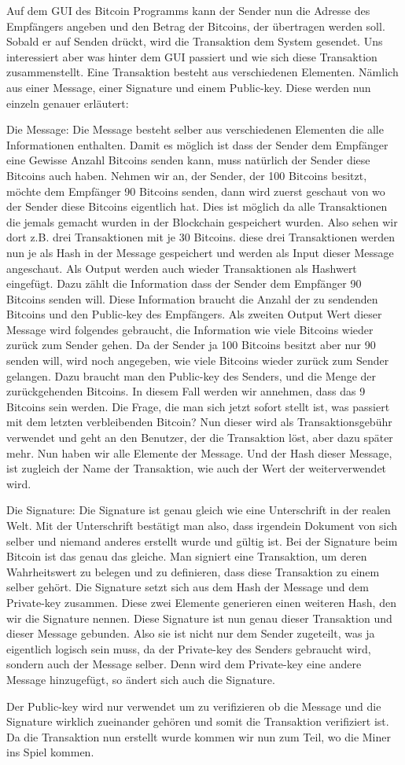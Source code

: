\noindent
Auf dem GUI des Bitcoin Programms kann der Sender nun die Adresse des Empfängers angeben und den Betrag der Bitcoins, der übertragen werden soll.
Sobald er auf Senden drückt, wird die Transaktion dem System gesendet. Uns interessiert aber was hinter dem GUI passiert und wie sich diese Transaktion zusammenstellt.
Eine Transaktion besteht aus verschiedenen Elementen. Nämlich aus einer Message, einer Signature und einem Public-key. Diese werden nun einzeln genauer erläutert:

\noindent
Die Message:
Die Message besteht selber aus verschiedenen Elementen die alle Informationen enthalten. Damit es möglich ist dass der Sender dem Empfänger eine Gewisse Anzahl Bitcoins senden kann, muss natürlich
der Sender diese Bitcoins auch haben. Nehmen wir an, der Sender, der 100 Bitcoins besitzt, möchte dem Empfänger 90 Bitcoins senden, dann wird zuerst geschaut von wo der Sender diese Bitcoins eigentlich hat. Dies ist möglich da
alle Transaktionen die jemals gemacht wurden in der Blockchain gespeichert wurden. Also sehen wir dort z.B. drei Transaktionen mit je 30 Bitcoins. diese drei Transaktionen werden nun je als Hash in der
Message gespeichert und werden als Input dieser Message angeschaut. Als Output werden auch wieder Transaktionen als Hashwert eingefügt. Dazu zählt die Information dass der Sender dem Empfänger 90 Bitcoins senden
will. Diese Information braucht die Anzahl der zu sendenden Bitcoins und den Public-key des Empfängers. Als zweiten Output Wert dieser Message wird folgendes gebraucht, die Information wie viele Bitcoins wieder
zurück zum Sender gehen. Da der Sender ja 100 Bitcoins besitzt aber nur 90 senden will, wird noch angegeben, wie viele Bitcoins wieder zurück zum Sender gelangen. Dazu braucht man den Public-key des Senders,
und die Menge der zurückgehenden Bitcoins. In diesem Fall werden wir annehmen, dass das 9 Bitcoins sein werden. Die Frage, die man sich jetzt sofort stellt ist, was passiert mit dem letzten verbleibenden
Bitcoin? Nun dieser wird als Transaktionsgebühr verwendet und geht an den Benutzer, der die Transaktion löst, aber dazu später mehr. Nun haben wir alle Elemente der Message. Und der Hash dieser Message, ist
zugleich der Name der Transaktion, wie auch der Wert der weiterverwendet wird.

\noindent
Die Signature:
Die Signature ist genau gleich wie eine Unterschrift in der realen Welt. Mit der Unterschrift bestätigt man also, dass irgendein Dokument von sich selber und niemand anderes erstellt wurde und gültig ist.
Bei der Signature beim Bitcoin ist das genau das gleiche. Man signiert eine Transaktion, um deren Wahrheitswert zu belegen und zu definieren, dass diese Transaktion zu einem selber gehört. Die Signature
setzt sich aus dem Hash der Message und dem Private-key zusammen. Diese zwei Elemente generieren einen weiteren Hash, den wir die Signature nennen. Diese Signature ist nun genau dieser Transaktion
und dieser Message gebunden. Also sie ist nicht nur dem Sender zugeteilt, was ja eigentlich logisch sein muss, da der Private-key des Senders gebraucht wird, sondern auch der Message selber. Denn wird
dem Private-key eine andere Message hinzugefügt, so ändert sich auch die Signature.

\noindent
Der Public-key wird nur verwendet um zu verifizieren ob die Message und die Signature wirklich zueinander gehören und somit die Transaktion verifiziert ist.
Da die Transaktion nun erstellt wurde kommen wir nun zum Teil, wo die Miner ins Spiel kommen.
